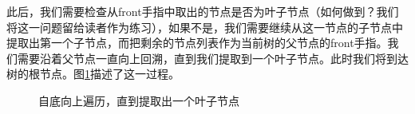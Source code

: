 \documentclass[b5paper]{ctexart}
\begin{document}
此后，我们需要检查从front手指中取出的节点是否为叶子节点（如何做到？我们将这一问题留给读者作为练习），如果不是，我们需要继续从这一节点的子节点中提取出第一个子节点，而把剩余的节点列表作为当前树的父节点的front手指。我们需要沿着父节点一直向上回溯，直到我们提取到一个叶子节点。此时我们将到达树的根节点。图\ref{fig:ftr-illed-extract}描述了这一过程。

\begin{figure}[htbp]
  \centering
  \caption{自底向上遍历，直到提取出一个叶子节点} \label{fig:ftr-illed-extract}
\end{figure}
\end{document}
